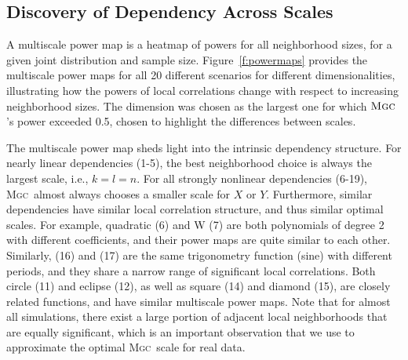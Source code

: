 \documentclass[11pt]{article}
\providecommand{\sct}[1]{{\normalfont\textsc{#1}}}
\newcommand{\Mgc}{\sct{Mgc}}
\begin{document}
\subsection*{Discovery of Dependency Across Scales}
\label{main3}

A multiscale power map is a heatmap of powers for all neighborhood sizes, for a given joint distribution and sample size.
Figure~\ref{f:powermaps} provides the multiscale power maps for all 20 different scenarios for different dimensionalities, illustrating how the powers of local correlations change with respect to increasing neighborhood sizes.
The dimension was chosen as the largest one for which $\Mgc$'s power exceeded 0.5, chosen to highlight the differences between scales.

The multiscale power map sheds light into the intrinsic dependency structure.
For nearly linear dependencies (1-5), the best neighborhood choice is always the largest scale, i.e., $k=l=n$. For all strongly nonlinear dependencies (6-19), \Mgc~almost always chooses a smaller scale for $X$ or $Y$.
 Furthermore, similar dependencies have similar local correlation structure, and thus similar optimal scales. For example, quadratic (6) and W (7) are both polynomials of degree 2 with different coefficients, and their power maps are quite similar to each other. Similarly,  (16) and (17) are the same trigonometry function (sine) with different periods, and they share a narrow range of significant local correlations.
Both circle (11) and eclipse (12), as well as square (14) and diamond (15), are closely related functions, and have similar multiscale power maps.
Note that for almost all simulations, there exist a large portion of adjacent local neighborhoods that are equally significant, which is an important observation that we use to approximate the optimal \Mgc~scale for real data.
\end{document}
